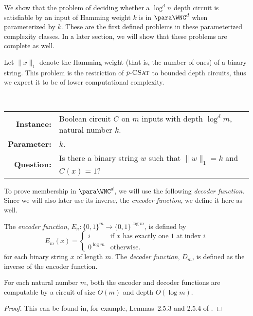 %
%
%
%
We show that the problem of deciding whether a $\log^d n$ depth circuit is satisfiable by an input of Hamming weight $k$ is in $\para \WNC^d$ when parameterized by $k$.
%
%
%
These are the first defined problems in these parameterized complexity classes.
%
%
In a later section, we will show that these problems are complete as well.

Let $\|x\|_1$ denote the Hamming weight (that is, the number of ones) of a binary string.
This problem is the restriction of $p \textnormal{-} \textsc{CSat}$ to bounded depth circuits, thus we expect it to be of lower computational complexity.

\begin{definition}[$\pNCSAT$]
  \mbox{} \\
  \begin{tabular}{r p{9.2cm}}
    \textbf{Instance:} & Boolean circuit $C$ on $m$ inputs with depth $\log^d m$, natural number $k$. \\
    \textbf{Parameter:} & $k$. \\
    \textbf{Question:} & Is there a binary string $w$ such that $\|w\|_1 = k$ and $C(x) = 1$?
  \end{tabular}
\end{definition}

To prove membership in $\para \WNC^d$, we will use the following \emph{decoder function}.
Since we will also later use its inverse, the \emph{encoder function}, we define it here as well.

\begin{definition}\label{def:coding}
  The \emph{encoder function}, $E_n \colon \{0, 1\}^m \to \{0, 1\}^{\log m}$, is defined by
  \[
  E_m(x) =
  \begin{cases}
    i & \text{if } x \text{ has exactly one 1 at index } i \\
    0^{\log m} & \text{otherwise}.
  \end{cases}
  \]
  for each binary string $x$ of length $m$.
  The \emph{decoder function}, $D_m$, is defined as the inverse of the encoder function.
\end{definition}

\begin{lemma}\label{lem:codingbounds}
  For each natural number $m$, both the encoder and decoder functions are computable by a circuit of size $O(m)$ and depth $O(\log m)$.
\end{lemma}
\begin{proof}
  This can be found in, for example, Lemmas~2.5.3 and 2.5.4 of \autocite{savage98}.
\end{proof}

